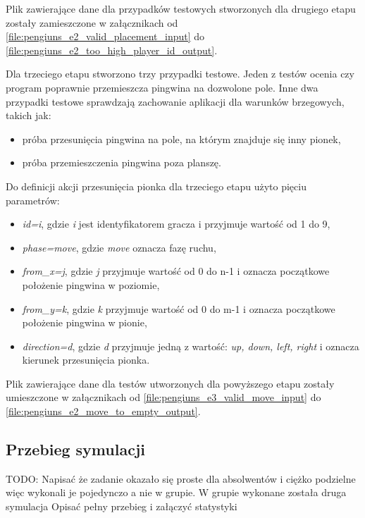 Plik zawierające dane dla przypadków testowych stworzonych dla drugiego etapu zostały zamieszczone w załącznikach od \ref{file:pengiuns_e2_valid_placement_input} do \ref{file:pengiuns_e2_too_high_player_id_output}.


Dla trzeciego etapu stworzono trzy przypadki testowe.
Jeden z testów ocenia czy program poprawnie przemieszcza pingwina na dozwolone pole.
Inne dwa przypadki testowe sprawdzają zachowanie aplikacji dla warunków brzegowych, takich jak:
\begin{itemize}
    \item próba przesunięcia pingwina na pole, na którym znajduje się inny pionek,
    \item próba przemieszczenia pingwina poza planszę.
\end{itemize}

Do definicji akcji przesunięcia pionka dla trzeciego etapu użyto pięciu parametrów:
\begin{itemize}
    \item \textit{id=i}, gdzie \textit{i} jest identyfikatorem gracza i przyjmuje wartość od 1 do 9,
    \item \textit{phase=move}, gdzie \textit{move} oznacza fazę ruchu,
    \item \textit{from\_x=j}, gdzie \textit{j} przyjmuje wartość od 0 do n-1 i oznacza początkowe położenie pingwina w poziomie,
    \item \textit{from\_y=k}, gdzie \textit{k} przyjmuje wartość od 0 do m-1 i oznacza początkowe położenie pingwina w pionie,
    \item \textit{direction=d}, gdzie \textit{d} przyjmuje jedną z wartość: \textit{up, down, left, right} i oznacza kierunek przesunięcia pionka.
\end{itemize}

Plik zawierające dane dla testów utworzonych dla powyższego etapu zostały umieszczone w załącznikach od \ref{file:pengiuns_e3_valid_move_input} do \ref{file:pengiuns_e2_move_to_empty_output}.


\subsection{Przebieg symulacji}
\label{penguins_simulation}

TODO: Napisać że zadanie okazało się proste dla absolwentów i ciężko podzielne więc wykonali je pojedynczo a nie w grupie.
W grupie wykonane została druga symulacja
Opisać pełny przebieg i załączyć statystyki

